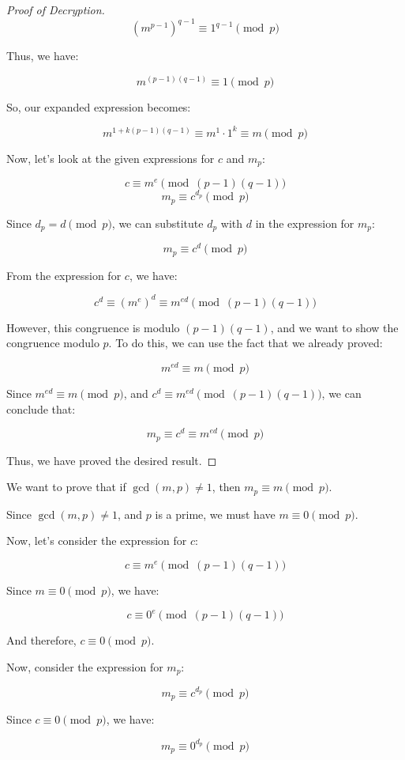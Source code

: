 \documentclass{article}
\theoremstyle{definition}
\begin{document}
\begin{proof}[Proof of Decryption]
		$$(m^{p-1})^{q-1} \equiv 1^{q-1} \pmod{p}$$
		
		Thus, we have:
		
		$$m^{(p-1)(q-1)} \equiv 1 \pmod{p}$$
		
		So, our expanded expression becomes:
		
		$$m^{1 + k(p-1)(q-1)} \equiv m^1 \cdot 1^k \equiv m \pmod{p}$$
		
		Now, let's look at the given expressions for $c$ and $m_p$:
		
		$$c \equiv m^e \pmod{(p-1)(q-1)}$$
		$$m_p \equiv c^{d_p} \pmod{p}$$
		
		Since $d_p = d \pmod p$, we can substitute $d_p$ with $d$ in the expression for $m_p$:
		
		$$m_p \equiv c^d \pmod{p}$$
		
		From the expression for $c$, we have:
		
		$$c^d \equiv (m^e)^d \equiv m^{ed} \pmod{(p-1)(q-1)}$$
		
		However, this congruence is modulo $(p-1)(q-1)$, and we want to show the congruence modulo $p$. To do this, we can use the fact that we already proved:
		
		$$m^{ed} \equiv m \pmod{p}$$
		
		Since $m^{ed} \equiv m \pmod{p}$, and $c^d \equiv m^{ed} \pmod{(p-1)(q-1)}$, we can conclude that:
		
		$$m_p \equiv c^d \equiv m^{ed} \pmod{p}$$
		
		Thus, we have proved the desired result.
	\end{proof}
	
	We want to prove that if $\gcd(m, p) \neq 1$, then $m_p \equiv m \pmod{p}$.
	
	Since $\gcd(m, p) \neq 1$, and $p$ is a prime, we must have $m \equiv 0 \pmod p$.
	
	Now, let's consider the expression for $c$:
	
	$$c \equiv m^e \pmod{(p-1)(q-1)}$$
	
	Since $m \equiv 0 \pmod p$, we have:
	
	$$c \equiv 0^e \pmod{(p-1)(q-1)}$$
	
	And therefore, $c \equiv 0 \pmod p$.
	
	Now, consider the expression for $m_p$:
	
	$$m_p \equiv c^{d_p} \pmod p$$
	
	Since $c \equiv 0 \pmod p$, we have:
	
	$$m_p \equiv 0^{d_p} \pmod p$$
	
\end{document}
